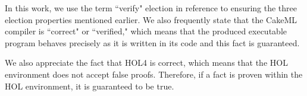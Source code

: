     In this work, we use the term ``verify" election in reference to ensuring the three election properties mentioned earlier. We also frequently state that the CakeML compiler is ``correct" or ``verified," which means that the produced executable program behaves precisely as it is written in its code and this fact is guaranteed.
    
    We also appreciate the fact that HOL4 is correct, which means that the HOL environment does not accept false proofs. Therefore, if a fact is proven within the HOL environment, it is guaranteed to be true.




